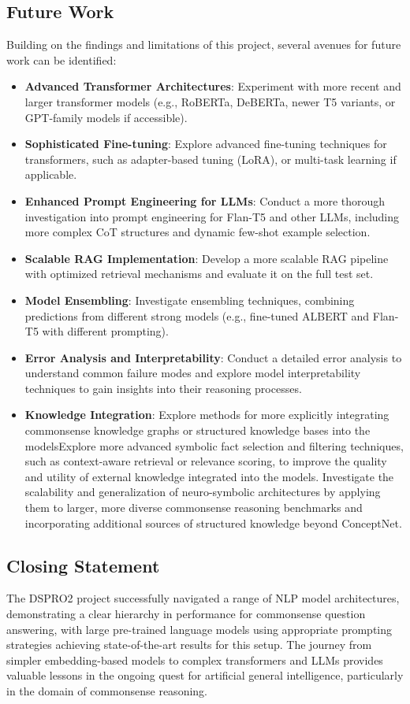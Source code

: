 \documentclass[10.5pt]{article}
\begin{document}
\subsection{Future Work}
Building on the findings and limitations of this project, several avenues for future work can be identified:
\begin{itemize}
    \item \textbf{Advanced Transformer Architectures}: Experiment with more recent and larger transformer models (e.g., RoBERTa, DeBERTa, newer T5 variants, or GPT-family models if accessible).
    \item \textbf{Sophisticated Fine-tuning}: Explore advanced fine-tuning techniques for transformers, such as adapter-based tuning (LoRA), or multi-task learning if applicable.
    \item \textbf{Enhanced Prompt Engineering for LLMs}: Conduct a more thorough investigation into prompt engineering for Flan-T5 and other LLMs, including more complex CoT structures and dynamic few-shot example selection.
    \item \textbf{Scalable RAG Implementation}: Develop a more scalable RAG pipeline with optimized retrieval mechanisms and evaluate it on the full test set.
    \item \textbf{Model Ensembling}: Investigate ensembling techniques, combining predictions from different strong models (e.g., fine-tuned ALBERT and Flan-T5 with different prompting).
    \item \textbf{Error Analysis and Interpretability}: Conduct a detailed error analysis to understand common failure modes and explore model interpretability techniques to gain insights into their reasoning processes.
    \item \textbf{Knowledge Integration}: Explore methods for more explicitly integrating commonsense knowledge graphs or structured knowledge bases into the modelsExplore more advanced symbolic fact selection and filtering techniques, such as context-aware retrieval or relevance scoring, to improve the quality and utility of external knowledge integrated into the models. Investigate the scalability and generalization of neuro-symbolic architectures by applying them to larger, more diverse commonsense reasoning benchmarks and incorporating additional sources of structured knowledge beyond ConceptNet.
\end{itemize}

\subsection{Closing Statement}
The DSPRO2 project successfully navigated a range of NLP model architectures, demonstrating a clear hierarchy in performance for commonsense question answering, with large pre-trained language models using appropriate prompting strategies achieving state-of-the-art results for this setup. The journey from simpler embedding-based models to complex transformers and LLMs provides valuable lessons in the ongoing quest for artificial general intelligence, particularly in the domain of commonsense reasoning.
\end{document}
